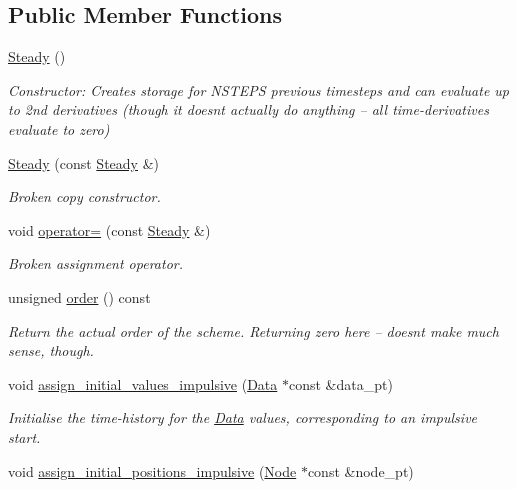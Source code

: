 \subsection*{Public Member Functions}
\begin{DoxyCompactItemize}
\item 
\hyperlink{classoomph_1_1Steady_a7e6510bdcdb448db8e4f975edd72bdaf}{Steady} ()
\begin{DoxyCompactList}\small\item\em Constructor\+: Creates storage for N\+S\+T\+E\+PS previous timesteps and can evaluate up to 2nd derivatives (though it doesn\textquotesingle{}t actually do anything -- all time-\/derivatives evaluate to zero) \end{DoxyCompactList}\item 
\hyperlink{classoomph_1_1Steady_af4d22661e0a41a82bcf08de797bd59e1}{Steady} (const \hyperlink{classoomph_1_1Steady}{Steady} \&)
\begin{DoxyCompactList}\small\item\em Broken copy constructor. \end{DoxyCompactList}\item 
void \hyperlink{classoomph_1_1Steady_a72bd55932539990df0c7b5db3a42926a}{operator=} (const \hyperlink{classoomph_1_1Steady}{Steady} \&)
\begin{DoxyCompactList}\small\item\em Broken assignment operator. \end{DoxyCompactList}\item 
unsigned \hyperlink{classoomph_1_1Steady_ac1735b614e9adf73a889e37afdd6d3a2}{order} () const
\begin{DoxyCompactList}\small\item\em Return the actual order of the scheme. Returning zero here -- doesn\textquotesingle{}t make much sense, though. \end{DoxyCompactList}\item 
void \hyperlink{classoomph_1_1Steady_a1e25537dc2c134d8d23a9d5c1a1be328}{assign\+\_\+initial\+\_\+values\+\_\+impulsive} (\hyperlink{classoomph_1_1Data}{Data} $\ast$const \&data\+\_\+pt)
\begin{DoxyCompactList}\small\item\em Initialise the time-\/history for the \hyperlink{classoomph_1_1Data}{Data} values, corresponding to an impulsive start. \end{DoxyCompactList}\item 
void \hyperlink{classoomph_1_1Steady_ad0aa4ed8297b77af2295827b1c0052b0}{assign\+\_\+initial\+\_\+positions\+\_\+impulsive} (\hyperlink{classoomph_1_1Node}{Node} $\ast$const \&node\+\_\+pt)

\end{DoxyCompactItemize}
